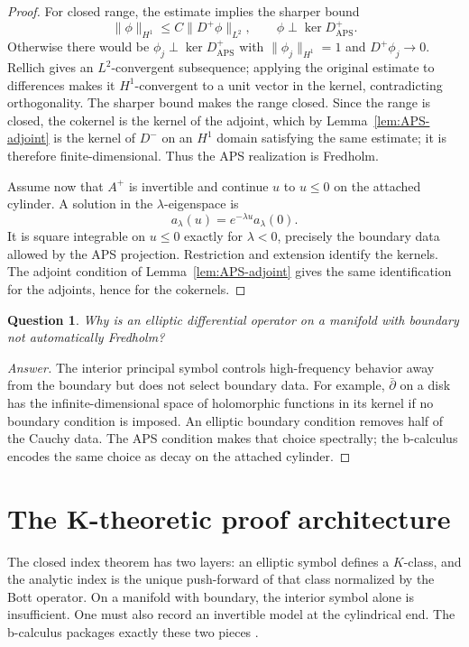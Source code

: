 \documentclass[12pt,oneside,reqno]{article}
\theoremstyle{plain}
\newtheorem{question}[theorem]{Question}
\theoremstyle{definition}
\theoremstyle{remark}
\newenvironment{answer}{\begin{proof}[Answer]}{\end{proof}}
\begin{document}
\begin{proof}
For closed range, the estimate implies the sharper bound
\[
 \lVert \phi\rVert_{H^1}\leq C\lVert D^+\phi\rVert_{L^2},
 \qquad \phi\perp\ker D^+_{\mathrm{APS}}.
\]
Otherwise there would be \(\phi_j\perp\ker D^+_{\mathrm{APS}}\) with
\(\lVert \phi_j\rVert_{H^1}=1\) and \(D^+\phi_j\to0\). Rellich gives an
\(L^2\)-convergent subsequence; applying the original estimate to
differences makes it \(H^1\)-convergent to a unit vector in the kernel,
contradicting orthogonality. The sharper bound makes the range closed.
Since the range is closed, the cokernel is the kernel of the adjoint,
which by Lemma~\ref{lem:APS-adjoint} is the kernel of \(D^-\) on an
\(H^1\) domain satisfying the same estimate; it is therefore
finite-dimensional. Thus the APS realization is Fredholm.

Assume now that \(A^+\) is invertible and continue \(u\) to \(u\leq0\) on
the attached cylinder. A solution in the \(\lambda\)-eigenspace is
\[
 a_\lambda(u)=e^{-\lambda u}a_\lambda(0).
\]
It is square integrable on \(u\leq0\) exactly for \(\lambda<0\), precisely
the boundary data allowed by the APS projection.  Restriction and extension
identify the kernels.  The adjoint condition of
Lemma~\ref{lem:APS-adjoint} gives the same identification for the
adjoints, hence for the cokernels.
\end{proof}

\begin{question}
Why is an elliptic differential operator on a manifold with boundary not
automatically Fredholm?
\end{question}

\begin{answer}
The interior principal symbol controls high-frequency behavior away from
the boundary but does not select boundary data.  For example,
\(\bar\partial\) on a disk has the infinite-dimensional space of
holomorphic functions in its kernel if no boundary condition is imposed.
An elliptic boundary condition removes half of the Cauchy data.  The APS
condition makes that choice spectrally; the b-calculus encodes the same
choice as decay on the attached cylinder.
\end{answer}

\section{The K-theoretic proof architecture}
\label{sec:K-theory}

The closed index theorem has two layers: an elliptic symbol defines a
\(K\)-class, and the analytic index is the unique push-forward of that
class normalized by the Bott operator. On a manifold with boundary, the
interior symbol alone is insufficient. One must also record an invertible
model at the cylindrical end. The b-calculus packages exactly these two
pieces \cite{Melrose,MelrosePiazza}.
\end{document}
